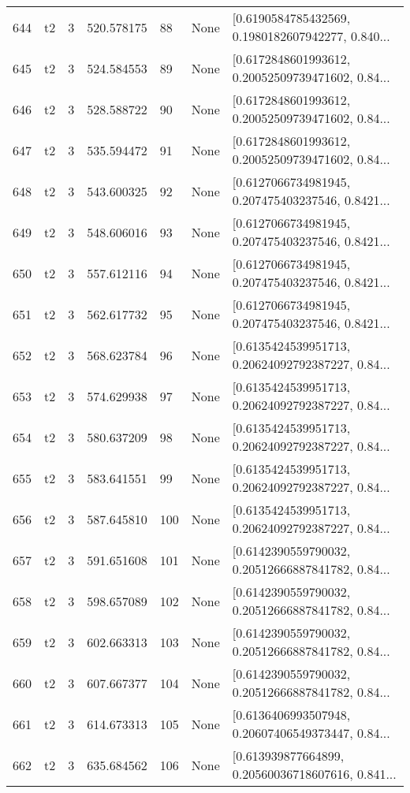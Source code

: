 \begin{tabular}{lllrlll}
644 &  t2 &   3 &   520.578175 &   88 &  None &  [0.6190584785432569, 0.1980182607942277, 0.840... \\
645 &  t2 &   3 &   524.584553 &   89 &  None &  [0.6172848601993612, 0.20052509739471602, 0.84... \\
646 &  t2 &   3 &   528.588722 &   90 &  None &  [0.6172848601993612, 0.20052509739471602, 0.84... \\
647 &  t2 &   3 &   535.594472 &   91 &  None &  [0.6172848601993612, 0.20052509739471602, 0.84... \\
648 &  t2 &   3 &   543.600325 &   92 &  None &  [0.6127066734981945, 0.207475403237546, 0.8421... \\
649 &  t2 &   3 &   548.606016 &   93 &  None &  [0.6127066734981945, 0.207475403237546, 0.8421... \\
650 &  t2 &   3 &   557.612116 &   94 &  None &  [0.6127066734981945, 0.207475403237546, 0.8421... \\
651 &  t2 &   3 &   562.617732 &   95 &  None &  [0.6127066734981945, 0.207475403237546, 0.8421... \\
652 &  t2 &   3 &   568.623784 &   96 &  None &  [0.6135424539951713, 0.20624092792387227, 0.84... \\
653 &  t2 &   3 &   574.629938 &   97 &  None &  [0.6135424539951713, 0.20624092792387227, 0.84... \\
654 &  t2 &   3 &   580.637209 &   98 &  None &  [0.6135424539951713, 0.20624092792387227, 0.84... \\
655 &  t2 &   3 &   583.641551 &   99 &  None &  [0.6135424539951713, 0.20624092792387227, 0.84... \\
656 &  t2 &   3 &   587.645810 &  100 &  None &  [0.6135424539951713, 0.20624092792387227, 0.84... \\
657 &  t2 &   3 &   591.651608 &  101 &  None &  [0.6142390559790032, 0.20512666887841782, 0.84... \\
658 &  t2 &   3 &   598.657089 &  102 &  None &  [0.6142390559790032, 0.20512666887841782, 0.84... \\
659 &  t2 &   3 &   602.663313 &  103 &  None &  [0.6142390559790032, 0.20512666887841782, 0.84... \\
660 &  t2 &   3 &   607.667377 &  104 &  None &  [0.6142390559790032, 0.20512666887841782, 0.84... \\
661 &  t2 &   3 &   614.673313 &  105 &  None &  [0.6136406993507948, 0.20607406549373447, 0.84... \\
662 &  t2 &   3 &   635.684562 &  106 &  None &  [0.613939877664899, 0.20560036718607616, 0.841... \\

\end{tabular}
